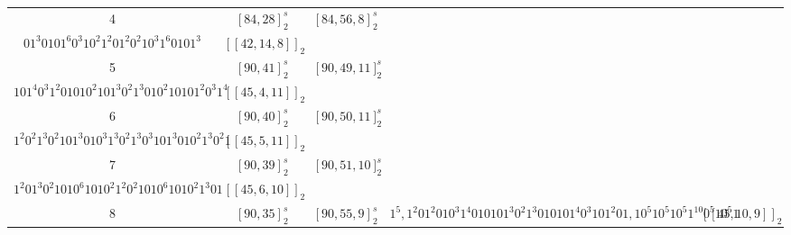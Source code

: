 \documentclass[journal]{IEEEtran}
\begin{document}
\begin{table}[!t]
\begin{tabular}{ccccc}
		 4  &  $[84,28]_2^s$  &   $[84,56,8]_2^s$   &                                                                                                                                                         \makecell[c]{$10^{3}10^{3}10101,0^{4}10^{3}10^{3}101^{3}0^{2}10^{3}10^{2}1^{3}010^{3}10^{3}1$,\\$01^{3}0101^{6}0^{3}10^{2}1^{2}01^{2}0^{2}10^{3}1^{6}0101^3$}                                                                                                                                                         & $[[42,14,8]]_2$  \\
		 5  &  $[90,41]_2^s$  &  $[90,49,11]_2^s$   &                                                                                                                                                        \makecell[c]{$10^{2}1^2,1010101^{3}0^{2}10^{2}1^{3}01^{10}01^{3}0^{2}10^{2}1^{3}0101$,\\$101^{4}0^{3}1^{2}01010^{2}101^{3}0^{2}1^{3}010^{2}10101^{2}0^{3}1^4$ }                                                                                                                                                        & $[[45,4,11]]_2$  \\
		 6  &  $[90,40]_2^s$  &  $[90,50,11]_2^s$   &                                                                                                                                                  \makecell[c]{$10101^2,1^{2}0^{5}1010101^{2}0^{2}1^{2}0^{8}1^{2}0^{2}1^{2}0101010^{5}1$,\\$1^{2}0^{2}1^{3}0^{2}101^{3}010^{3}1^{3}0^{2}1^{3}0^{3}101^{3}010^{2}1^{3}0^{2}1$}                                                                                                                                                  & $[[45,5,11]]_2$  \\
		 7  &  $[90,39]_2^s$  &  $[90,51,10]_2^s$   &                                                                                                                                                   \makecell[c]{$10^{2}10^{2}1,10101^{2}0^{3}10^{2}10^{3}10^{2}10^{6}10^{2}10^{3}10^{2}10^{3}1^{2}01$,\\$1^{2}01^{3}0^{2}1010^{6}1010^{2}1^{2}0^{2}1010^{6}1010^{2}1^{3}01$}                                                                                                                                                   & $[[45,6,10]]_2$  \\
		 8  &  $[90,35]_2^s$  &   $[90,55,9]_2^s$   &                                                                                                                                                                                $1^5,1^{2}01^{2}010^{3}1^{4}010101^{3}0^{2}1^{3}010101^{4}0^{3}101^{2}01,10^{5}10^{5}10^{5}1^{10}0^{5}10^{5}1$                                                                                                                                                                                 & $[[45,10,9]]_2$  \\

\end{tabular}
\end{table}
\end{document}
